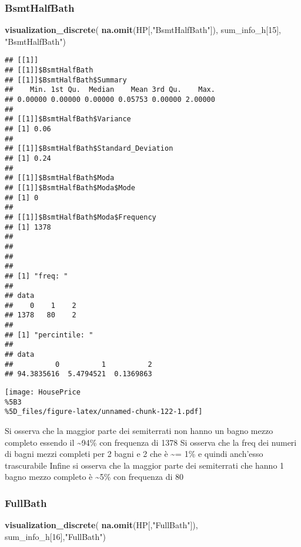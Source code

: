 \documentclass[
]{article}
\newenvironment{Shaded}{\begin{snugshade}}{\end{snugshade}}
\newcommand{\DecValTok}[1]{\textcolor[rgb]{0.00,0.00,0.81}{#1}}
\newcommand{\FunctionTok}[1]{\textcolor[rgb]{0.13,0.29,0.53}{\textbf{#1}}}
\newcommand{\NormalTok}[1]{#1}
\newcommand{\StringTok}[1]{\textcolor[rgb]{0.31,0.60,0.02}{#1}}
\begin{document}
\subsubsection{BsmtHalfBath}\label{bsmthalfbath}

\begin{Shaded}
\begin{Highlighting}[]
\FunctionTok{visualization\_discrete}\NormalTok{(}
  \FunctionTok{na.omit}\NormalTok{(HP[,}\StringTok{"BsmtHalfBath"}\NormalTok{]),}
\NormalTok{  sum\_info\_h[}\DecValTok{15}\NormalTok{],}
  \StringTok{"BsmtHalfBath"}\NormalTok{)}
\end{Highlighting}
\end{Shaded}

\begin{verbatim}
## [[1]]
## [[1]]$BsmtHalfBath
## [[1]]$BsmtHalfBath$Summary
##    Min. 1st Qu.  Median    Mean 3rd Qu.    Max. 
## 0.00000 0.00000 0.00000 0.05753 0.00000 2.00000 
## 
## [[1]]$BsmtHalfBath$Variance
## [1] 0.06
## 
## [[1]]$BsmtHalfBath$Standard_Deviation
## [1] 0.24
## 
## [[1]]$BsmtHalfBath$Moda
## [[1]]$BsmtHalfBath$Moda$Mode
## [1] 0
## 
## [[1]]$BsmtHalfBath$Moda$Frequency
## [1] 1378
## 
## 
## 
## 
## [1] "freq: "
## 
## data
##    0    1    2 
## 1378   80    2 
## 
## [1] "percintile: "
## 
## data
##          0          1          2 
## 94.3835616  5.4794521  0.1369863
\end{verbatim}

\texttt{[image: HousePrice\\\%5B3\\\%5D\_files/figure-latex/unnamed-chunk-122-1.pdf]}

Si osserva che la maggior parte dei semiterrati non hanno un bagno mezzo
completo essendo il \textasciitilde94\% con frequenza di 1378 Si osserva
che la freq dei numeri di bagni mezzi completi per 2 bagni e 2 che è
\textasciitilde= 1\% e quindi anch'esso trascurabile Infine si osserva
che la maggior parte dei semiterrati che hanno 1 bagno mezzo completo è
\textasciitilde5\% con frequenza di 80

\subsubsection{FullBath}\label{fullbath}

\begin{Shaded}
\begin{Highlighting}[]
\FunctionTok{visualization\_discrete}\NormalTok{(}
  \FunctionTok{na.omit}\NormalTok{(HP[,}\StringTok{"FullBath"}\NormalTok{]),}
\NormalTok{  sum\_info\_h[}\DecValTok{16}\NormalTok{],}\StringTok{"FullBath"}\NormalTok{)}
\end{Highlighting}
\end{Shaded}
\end{document}
